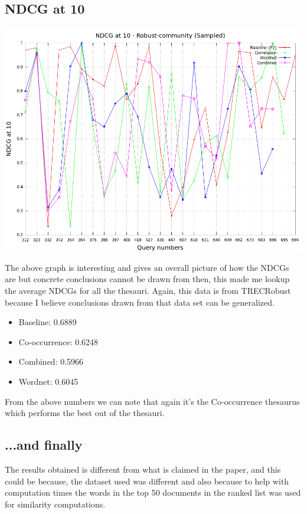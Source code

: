 \documentclass[a4paper, 12pt, notitlepage]{report}
\begin{document}
\subsection*{NDCG at 10}
\begin{center}
\includegraphics[scale = 0.4]{sampled-robust-comm_ndcg10}
\end{center}

The above graph is interesting and gives an overall picture of how the NDCGs are but concrete conclusions cannot be drawn from then, this made me lookup the average NDCGs for all the thesauri. Again, this data is from TRECRobust because I believe conclusions drawn from that data set can be generalized.

\begin{itemize}
\item Baseline: 0.6889
\item Co-occurrence: 0.6248
\item Combined: 0.5966
\item Wordnet: 0.6045
\end{itemize}

From the above numbers we can note that again it's the Co-occurrence thesaurus which performs the best out of the thesauri. 

\subsection*{...and finally} 
The results obtained is different from what is claimed in the paper, and this could be because, the dataset used was different and also because to help with computation times the words in the top 50 documents in the ranked list was used for similarity computations. 
\end{document}
